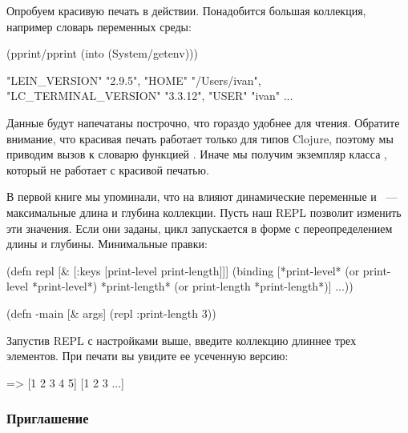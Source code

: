 Опробуем красивую печать в действии. Понадобится большая коллекция, например словарь переменных среды:

\pagebreaklarge

\begin{english}
  \begin{clojure}
(pprint/pprint
  (into {} (System/getenv)))

{"LEIN_VERSION" "2.9.5",
 "HOME" "/Users/ivan",
 "LC_TERMINAL_VERSION" "3.3.12",
 "USER" "ivan"
 ...
 }
  \end{clojure}
\end{english}

Данные будут напечатаны построчно, что гораздо удобнее для чтения. Обратите внимание, что красивая печать работает только для типов Clojure, поэтому мы приводим вызов  к словарю функцией . Иначе мы получим экземпляр класса , который не работает с красивой печатью.


В первой книге мы упоминали, что на  влияют динамические переменные  и ~--- максимальные длина и глубина коллекции. Пусть наш REPL позволит изменить эти значения. Если они заданы, цикл запускается в форме  с переопределением длины и глубины. Минимальные правки:

\begin{english}
  \begin{clojure}
(defn repl [& [{:keys [print-level
                       print-length]}]]
  (binding [*print-level*
            (or print-level *print-level*)
            *print-length*
            (or print-length *print-length*)]
    ...))

(defn -main [& args]
  (repl {:print-length 3}))
  \end{clojure}
\end{english}

Запустив REPL с настройками выше, введите коллекцию длиннее трех элементов. При печати вы увидите ее усеченную версию:

\begin{english}
  \begin{clojure}
=> [1 2 3 4 5]
[1 2 3 ...]
  \end{clojure}
\end{english}

\subsubsection{Приглашение}

